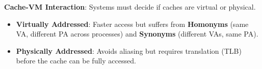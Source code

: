\begin{lemma}
	\textbf{Cache-VM Interaction}: Systems must decide if caches are virtual or physical.
	\begin{itemize}
		\item \textbf{Virtually Addressed}: Faster access but suffers from \textbf{Homonyms} (same VA, different PA across processes) and \textbf{Synonyms} (different VAs, same PA).
		\item \textbf{Physically Addressed}: Avoids aliasing but requires translation (TLB) before the cache can be fully accessed.
	\end{itemize}
\end{lemma}
